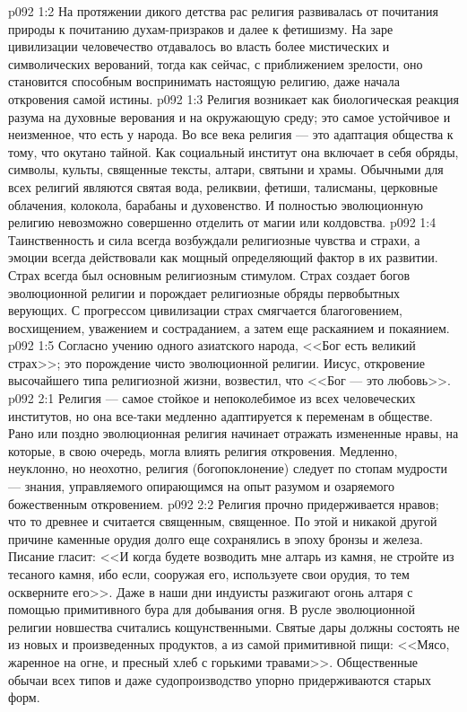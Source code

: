 \vs p092 1:2 На протяжении дикого детства рас религия развивалась от почитания природы к почитанию духам\hyp{}призраков и далее к фетишизму. На заре цивилизации человечество отдавалось во власть более мистических и символических верований, тогда как сейчас, с приближением зрелости, оно становится способным воспринимать настоящую религию, даже начала откровения самой истины.
\vs p092 1:3 Религия возникает как биологическая реакция разума на духовные верования и на окружающую среду; это самое устойчивое и неизменное, что есть у народа. Во все века религия --- это адаптация общества к тому, что окутано тайной. Как социальный институт она включает в себя обряды, символы, культы, священные тексты, алтари, святыни и храмы. Обычными для всех религий являются святая вода, реликвии, фетиши, талисманы, церковные облачения, колокола, барабаны и духовенство. И полностью эволюционную религию невозможно совершенно отделить от магии или колдовства.
\vs p092 1:4 Таинственность и сила всегда возбуждали религиозные чувства и страхи, а эмоции всегда действовали как мощный определяющий фактор в их развитии. Страх всегда был основным религиозным стимулом. Страх создает богов эволюционной религии и порождает религиозные обряды первобытных верующих. С прогрессом цивилизации страх смягчается благоговением, восхищением, уважением и состраданием, а затем еще раскаянием и покаянием.
\vs p092 1:5 Согласно учению одного азиатского народа, <<Бог есть великий страх>>; это порождение чисто эволюционной религии. Иисус, откровение высочайшего типа религиозной жизни, возвестил, что <<Бог --- это любовь>>.
\vs p092 2:1 Религия --- самое стойкое и непоколебимое из всех человеческих институтов, но она все\hyp{}таки медленно адаптируется к переменам в обществе. Рано или поздно эволюционная религия начинает отражать измененные нравы, на которые, в свою очередь, могла влиять религия откровения. Медленно, неуклонно, но неохотно, религия (богопоклонение) следует по стопам мудрости --- знания, управляемого опирающимся на опыт разумом и озаряемого божественным откровением.
\vs p092 2:2 Религия прочно придерживается нравов; что  то древнее и считается священным, священное. По этой и никакой другой причине каменные орудия долго еще сохранялись в эпоху бронзы и железа. Писание гласит: <<И когда будете возводить мне алтарь из камня, не стройте из тесаного камня, ибо если, сооружая его, используете свои орудия, то тем оскверните его>>. Даже в наши дни индуисты разжигают огонь алтаря с помощью примитивного бура для добывания огня. В русле эволюционной религии новшества считались кощунственными. Святые дары должны состоять не из новых и произведенных продуктов, а из самой примитивной пищи: <<Мясо, жаренное на огне, и пресный хлеб с горькими травами>>. Общественные обычаи всех типов и даже судопроизводство упорно придерживаются старых форм.
